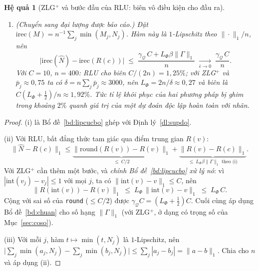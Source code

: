 \documentclass[11pt]{article}
\newtheorem{hequa}[dinhly]{Hệ quả}
\theoremstyle{remark}
\begin{document}
\begin{hequa}[ZLG$^+$ và bước đầu của RLU: biên vô điều kiện cho đầu ra]
\begin{enumerate}
{ giả thiết nào thêm,}
 \begin{equation}
  \bigl\|\widehat N - R(c)\bigr\|_1
  \;\le\; \gamma_{\mathcal{Q}}\,C \;+\; L_\Phi\,\beta\,\|\Gamma\|_1
  \;\xrightarrow[\bar\epsilon\to0]{}\; \gamma_{\mathcal{Q}}\,C .
  \label{eq:bienluongtu}
 \end{equation}
\item[(iii)] \textup{(Chuyển sang đại lượng được báo cáo.)} Đặt
 $\mathrm{irec}(M) = n^{-1}\sum_j \min(M_j, N_j)$. Hàm này là
 $1$-Lipschitz theo $\|\cdot\|_1/n$, nên
 \begin{equation}
  \bigl|\mathrm{irec}(\widehat N) - \mathrm{irec}(R(c))\bigr|
  \;\le\; \frac{\gamma_{\mathcal{Q}}\,C + L_\Phi\beta\|\Gamma\|_1}{n}
  \;\xrightarrow[\bar\epsilon\to0]{}\; \frac{\gamma_{\mathcal{Q}}\,C}{n}.
  \label{eq:bienirec}
 \end{equation}
 Với $C = 10$, $n = 400$: RLU cho biên $C/(2n) = 1{,}25\%$; với ZLG$^+$ và
 $\bar p_j \approx 0{,}75$ ta có $\delta = n\sum_j\bar p_j \approx 3000$, nên
 $L_\Phi = 2n/\delta \approx 0{,}27$ và biên là
 $C(L_\Phi+\tfrac12)/n \approx 1{,}92\%$. Tức tỉ lệ khôi phục của hai phương
 pháp bị ghim trong khoảng $2\%$ quanh giá trị của một dự đoán \emph{độc lập
 hoàn toàn với nhãn}.
\end{enumerate}
\end{hequa}

\begin{proof}
(i) là Bổ đề~\ref{bd:lipcucbo} ghép với Định lý~\ref{dl:supdo}.

(ii) Với RLU, bất đẳng thức tam giác qua điểm trung gian $R(v)$:
\[
 \bigl\|\widehat N - R(c)\bigr\|_1
 \le \underbrace{\bigl\|\mathrm{round}(R(v)) - R(v)\bigr\|_1}_{\le\ C/2}
 + \underbrace{\bigl\|R(v) - R(c)\bigr\|_1}_{\le\ L_\Phi \beta \|\Gamma\|_1 \text{ theo (i)}} .
\]
Với ZLG$^+$ cần thêm một bước, và \emph{chính Bổ đề~\ref{bd:lipcucbo} xử lý
nó}: vì $|\mathrm{int}(v_j) - v_j| \le 1$ với mọi $j$, ta có
$\|\mathrm{int}(v)-v\|_1 \le C$, nên
\[
 \bigl\|R(\mathrm{int}(v)) - R(v)\bigr\|_1 \;\le\; L_\Phi\,\|\mathrm{int}(v)-v\|_1
 \;\le\; L_\Phi\,C .
\]
Cộng với sai số của \texttt{round} ($\le C/2$) được
$\gamma_{\mathcal{Q}}C = (L_\Phi+\tfrac12)C$. Cuối cùng áp dụng
Bổ đề~\ref{bd:chuan} cho số hạng $\|\Gamma\|_1$ (với ZLG$^+$, ở dạng có trọng
số của Mục~\ref{sec:coso}).

(iii) Với mỗi $j$, hàm $t \mapsto \min(t, N_j)$ là $1$-Lipschitz, nên
$\bigl|\sum_j \min(a_j,N_j) - \sum_j\min(b_j,N_j)\bigr| \le \sum_j |a_j-b_j|
 = \|a-b\|_1$. Chia cho $n$ và áp dụng (ii).
\end{proof}
\end{document}
